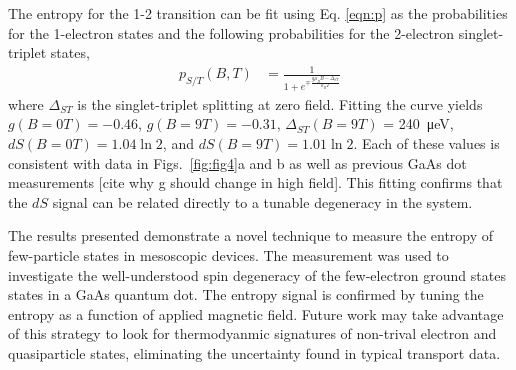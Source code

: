\documentclass[twocolumn,showpacs,preprintnumbers,amsmath,amssymb,pra,aps,superscriptaddress]{revtex4-1}
\begin{document}
The entropy for the 1-2 transition can be fit using Eq. \ref{eqn:p} as the probabilities for the 1-electron states and the following probabilities for the 2-electron singlet-triplet states,
%
\begin{align}
\label{eqn:pst}
        p_{S/T}(B, T) &= \frac{1}{1+ e^{\mp \frac{g\mu_B B - \Delta_{ST}}{k_B T}}}
\end{align}
%
where $\Delta_{ST}$ is the singlet-triplet splitting at zero field. Fitting the curve yields $g(B{=}0T)=-0.46$, $g(B{=}9T)=-0.31$, $\Delta_{ST}(B{=}9T)$ = \SI{240}{\micro\electronvolt}, $dS(B{=}0T) = 1.04\ln{2}$, and $dS(B{=}9T) = 1.01\ln{2}$. Each of these values is consistent with data in Figs.~\ref{fig:fig4}a and b as well as previous GaAs dot measurements [cite why g should change in high field]. This fitting confirms that the $dS$ signal can be related directly to a tunable degeneracy in the system.

The results presented demonstrate a novel technique to measure the entropy of few-particle states in mesoscopic devices. The measurement was used to investigate the well-understood spin degeneracy of the few-electron ground states states in a GaAs quantum dot. The entropy signal is confirmed by tuning the entropy as a function of applied magnetic field. Future work may take advantage of this strategy to look for thermodyanmic signatures of non-trival electron and quasiparticle states, eliminating the uncertainty found in typical transport data.


{}

\end{document}
